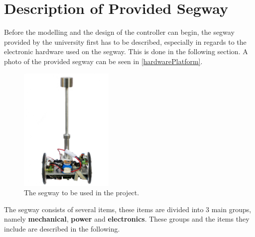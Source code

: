 \section{Description of Provided Segway} \label{sec:hardware}
Before the modelling and the design of the controller can begin, the segway provided by the university first has to be described, especially in regards to the electronic hardware used on the segway. This is done in the following section. A photo of the provided segway can be seen in \autoref{hardwarePlatform}. 

\begin{figure}[H]
	\centering
	\includegraphics[width=0.4\textwidth]{figures/hardwarePlatform.jpg}
	\caption{The segway to be used in the project.}
	\label{hardwarePlatform}
\end{figure}

The segway consists of several items, these items are divided into 3 main groups, namely \textbf{mechanical}, \textbf{power} and \textbf{electronics}. These groups and the items they include are described in the following.

